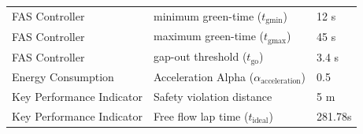 \begin{table}[H]
\begin{tabular}{lll}
FAS Controller & minimum green-time (\(t_\text{gmin}\)) & 12 s \\
FAS Controller & maximum green-time (\(t_\text{gmax}\)) & 45 s \\
FAS Controller & gap-out threshold (\(t_\text{go}\)) & 3.4 s \\
\midrule
Energy Consumption & Acceleration Alpha ($\alpha_\text{acceleration}$) & 0.5 \\
\midrule
Key Performance Indicator & Safety violation distance  & 5 m\\
Key Performance Indicator & Free flow lap time (\(t_\text{ideal}\)) & 281.78s\\
\bottomrule
\end{tabular}
\label{tab:simulation_parameters}
\end{table}
